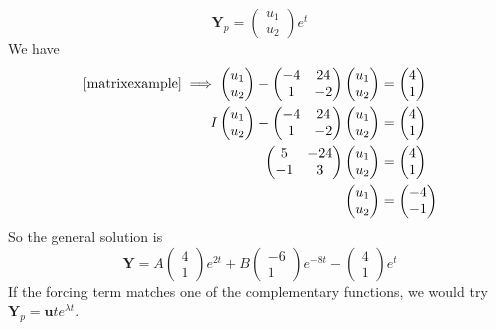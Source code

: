 \documentclass{article}
\begin{document}
	\[ \bm Y_p = \begin{pmatrix}
		u_1 \\ u_2
	\end{pmatrix} e^t \]
	We have
	\begin{align*}
		\eqref{matrixexample} \implies \begin{pmatrix}
			u_1 \\ u_2
		\end{pmatrix} - \begin{pmatrix}
			-4 & 24 \\ 1 & -2
		\end{pmatrix}\begin{pmatrix}
			u_1 \\ u_2
		\end{pmatrix} &= \begin{pmatrix}
			4 \\ 1
		\end{pmatrix} \\
		I\begin{pmatrix}
			u_1 \\ u_2
		\end{pmatrix} - \begin{pmatrix}
			-4 & 24 \\ 1 & -2
		\end{pmatrix}\begin{pmatrix}
			u_1 \\ u_2
		\end{pmatrix} &= \begin{pmatrix}
			4 \\ 1
		\end{pmatrix} \\
		\begin{pmatrix}
			5 & -24 \\ -1 & 3
		\end{pmatrix}\begin{pmatrix}
			u_1 \\ u_2
		\end{pmatrix} &= \begin{pmatrix}
			4 \\ 1
		\end{pmatrix} \\
		\begin{pmatrix}
			u_1 \\ u_2
		\end{pmatrix} &= \begin{pmatrix}
			-4 \\ -1
		\end{pmatrix}
	\end{align*}
	So the general solution is
	\[ \bm Y = A\begin{pmatrix}
		4 \\ 1
	\end{pmatrix}e^{2t} + B\begin{pmatrix}
		-6 \\ 1
	\end{pmatrix}e^{-8t} - \begin{pmatrix}
		4 \\ 1
	\end{pmatrix}e^t \]
	If the forcing term matches one of the complementary functions, we would try $\bm Y_p = \bm u te^{\lambda t}$.
\end{document}
